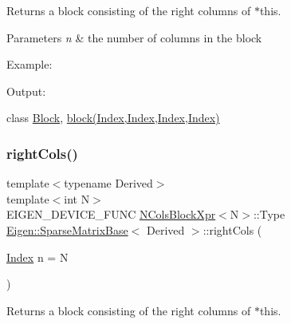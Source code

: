 \begin{DoxyReturn}{Returns}
a block consisting of the right columns of $\ast$this.
\end{DoxyReturn}

\begin{DoxyParams}{Parameters}
{\em n} & the number of columns in the block\\
\hline
\end{DoxyParams}
Example\+: 
\begin{DoxyCodeInclude}{0}
\end{DoxyCodeInclude}
 Output\+: 
\begin{DoxyVerbInclude}
\end{DoxyVerbInclude}
 class \mbox{\hyperlink{class_eigen_1_1_block}{Block}}, \mbox{\hyperlink{class_eigen_1_1_sparse_matrix_base_a7c28a2f511181c727396d5e813519d38}{block(\+Index,\+Index,\+Index,\+Index)}} \mbox{\label{class_eigen_1_1_sparse_matrix_base_ad70dcf0cacd45a752f47aa3adc6444d9}} 
\subsubsection{\texorpdfstring{rightCols()}{rightCols()}\hspace{0.1cm}{\footnotesize\ttfamily [2/2]}}
{\footnotesize\ttfamily template$<$typename Derived$>$ \\
template$<$int N$>$ \\
E\+I\+G\+E\+N\+\_\+\+D\+E\+V\+I\+C\+E\+\_\+\+F\+U\+NC \mbox{\hyperlink{struct_eigen_1_1_sparse_matrix_base_1_1_n_cols_block_xpr}{N\+Cols\+Block\+Xpr}}$<$N$>$\+::Type \mbox{\hyperlink{class_eigen_1_1_sparse_matrix_base}{Eigen\+::\+Sparse\+Matrix\+Base}}$<$ Derived $>$\+::right\+Cols (\begin{DoxyParamCaption}\item[{\mbox{\hyperlink{struct_eigen_1_1_eigen_base_a554f30542cc2316add4b1ea0a492ff02}{Index}}}]{n = {\ttfamily N} }\end{DoxyParamCaption})\hspace{0.3cm}{\ttfamily [inline]}}

\begin{DoxyReturn}{Returns}
a block consisting of the right columns of $\ast$this.
\end{DoxyReturn}

